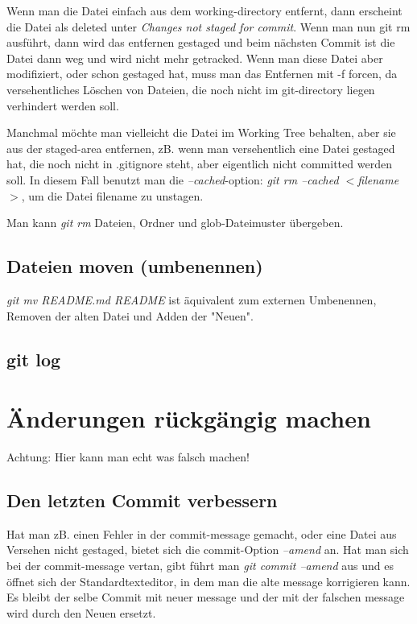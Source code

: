 \documentclass{article}
\begin{document}
Wenn man die Datei einfach aus dem working-directory entfernt, dann erscheint die Datei als deleted unter \textit{Changes not staged for commit}. Wenn man nun git rm ausführt, dann wird  das entfernen gestaged und beim nächsten Commit ist die Datei dann weg und wird nicht mehr getracked. Wenn man diese Datei aber modifiziert, oder schon gestaged hat, muss man das Entfernen mit -f forcen, da versehentliches Löschen von Dateien, die noch nicht im git-directory liegen verhindert werden soll.

Manchmal möchte man vielleicht die Datei im Working Tree behalten, aber sie aus der staged-area entfernen, zB. wenn man versehentlich eine Datei gestaged hat, die noch nicht in .gitignore steht, aber eigentlich nicht committed werden soll. In diesem Fall benutzt man die \textit{--cached}-option:  \textit{git rm --cached $<$filename$>$}, um die Datei filename zu unstagen.

Man kann \textit{git rm} Dateien, Ordner und glob-Dateimuster übergeben.

\subsection*{Dateien moven (umbenennen)}
\textit{git mv README.md README} ist äquivalent zum externen Umbenennen, Removen der alten Datei und Adden der "Neuen".

\subsection*{git log}

\section*{Änderungen rückgängig machen}
Achtung: Hier kann man echt was falsch machen!

\subsection*{Den letzten Commit verbessern}
Hat man zB. einen Fehler in der commit-message gemacht, oder eine Datei aus Versehen nicht gestaged, bietet sich die commit-Option \textit{--amend} an.
Hat man sich bei der commit-message vertan, gibt führt man \textit{git commit --amend} aus und es öffnet sich der Standardtexteditor, in dem man die alte message korrigieren kann. Es bleibt der selbe Commit mit neuer message und der mit der falschen message wird durch den Neuen ersetzt.
\end{document}

